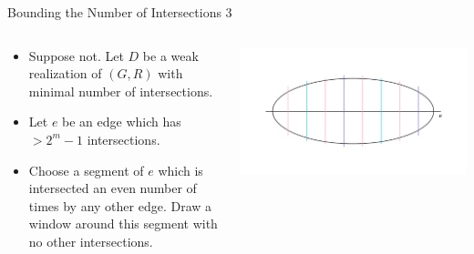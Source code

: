 \documentclass[10pt,aspectratio=169]{beamer}
\theoremstyle{plain}
\begin{document}
\begin{frame}{Bounding the Number of Intersections 3}
    \begin{columns}
    \begin{column}{0.35\textwidth}
        \begin{itemize}
            \item Suppose not. Let \(D\) be a weak realization of \((G, R)\) with minimal number of intersections.
            \item<2-> Let \(e\) be an edge which has \(> 2^m - 1\) intersections.
            \item<3-> Choose a segment of \(e\) which is intersected an even number of times by any other edge. Draw a window around this segment with no other intersections.
        \end{itemize}
    \end{column}
    \begin{column}{0.65\textwidth}
        \begin{center}
            \includegraphics[width=\textwidth]{images/figure-4.pdf}
        \end{center}
    \end{column}
    \end{columns}
\end{frame}
\end{document}
